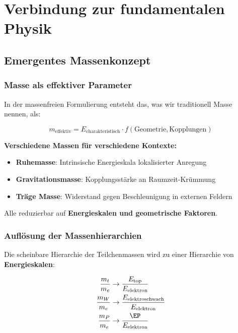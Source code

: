 	\section{Verbindung zur fundamentalen Physik}
	\label{sec:fundamental_connection}
	
	\subsection{Emergentes Massenkonzept}
	\label{subsec:emergent_mass}
	
	\subsubsection{Masse als effektiver Parameter}
	
	In der massenfreien Formulierung entsteht das, was wir traditionell Masse nennen, als:
	
	\begin{equation}
		m_{\text{effektiv}} = E_{\text{charakteristisch}} \cdot f(\text{Geometrie}, \text{Kopplungen})
		\label{eq:emergent_mass}
	\end{equation}
	
	\textbf{Verschiedene Massen für verschiedene Kontexte:}
	\begin{itemize}
		\item \textbf{Ruhemasse}: Intrinsische Energieskala lokalisierter Anregung
		\item \textbf{Gravitationsmasse}: Kopplungsstärke an Raumzeit-Krümmung  
		\item \textbf{Träge Masse}: Widerstand gegen Beschleunigung in externen Feldern
	\end{itemize}
	
	Alle reduzierbar auf \textbf{Energieskalen und geometrische Faktoren}.
	
	\subsubsection{Auflösung der Massenhierarchien}
	
	Die scheinbare Hierarchie der Teilchenmassen wird zu einer Hierarchie von \textbf{Energieskalen}:
	
	\begin{align}
		\frac{m_t}{m_e} &\rightarrow \frac{E_{\text{top}}}{E_{\text{elektron}}} \\
		\frac{m_W}{m_e} &\rightarrow \frac{E_{\text{elektroschwach}}}{E_{\text{elektron}}} \\
		\frac{m_P}{m_e} &\rightarrow \frac{\EP}{E_{\text{elektron}}}
	\end{align}
	
